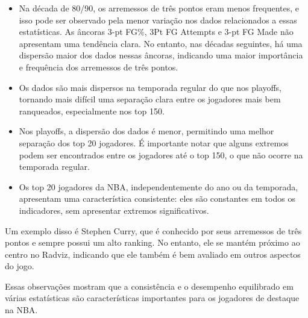 \documentclass[
]{book}
\begin{document}
\begin{itemize}
\item
  Na década de 80/90, os arremessos de três pontos eram menos frequentes, e isso pode ser observado pela menor variação nos dados relacionados a essas estatísticas. As âncoras 3-pt FG\%, 3Pt FG Attempts e 3-pt FG Made não apresentam uma tendência clara. No entanto, nas décadas seguintes, há uma dispersão maior dos dados nessas âncoras, indicando uma maior importância e frequência dos arremessos de três pontos.
\item
  Os dados são mais dispersos na temporada regular do que nos playoffs, tornando mais difícil uma separação clara entre os jogadores mais bem ranqueados, especialmente nos top 150.
\item
  Nos playoffs, a dispersão dos dados é menor, permitindo uma melhor separação dos top 20 jogadores. É importante notar que alguns extremos podem ser encontrados entre os jogadores até o top 150, o que não ocorre na temporada regular.
\item
  Os top 20 jogadores da NBA, independentemente do ano ou da temporada, apresentam uma característica consistente: eles são constantes em todos os indicadores, sem apresentar extremos significativos.
\end{itemize}

Um exemplo disso é Stephen Curry, que é conhecido por seus arremessos de três pontos e sempre possui um alto ranking. No entanto, ele se mantém próximo ao centro no Radviz, indicando que ele também é bem avaliado em outros aspectos do jogo.

Essas observações mostram que a consistência e o desempenho equilibrado em várias estatísticas são características importantes para os jogadores de destaque na NBA.
\end{document}
